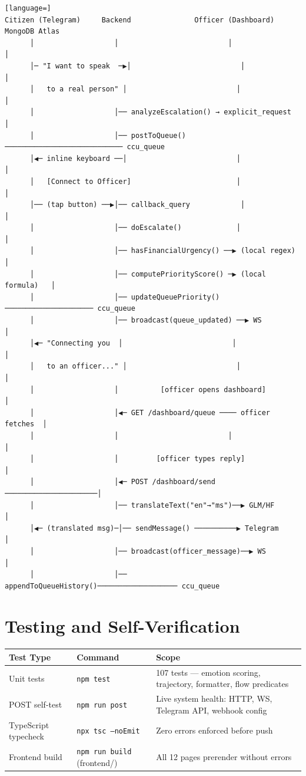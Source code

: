 \documentclass[12pt,a4paper]{article}
\begin{document}
\begin{lstlisting}[language=]
Citizen (Telegram)     Backend               Officer (Dashboard)   MongoDB Atlas
      │                   │                          │                  │
      │─ "I want to speak  ─▶│                          │                  │
      │   to a real person" │                          │                  │
      │                   │── analyzeEscalation() → explicit_request     │
      │                   │── postToQueue() ──────────────────────────── ccu_queue
      │◀─ inline keyboard ──│                          │                  │
      │   [Connect to Officer]                         │                  │
      │── (tap button) ──▶│── callback_query            │                  │
      │                   │── doEscalate()             │                  │
      │                   │── hasFinancialUrgency() ──▶ (local regex)     │
      │                   │── computePriorityScore() ─▶ (local formula)   │
      │                   │── updateQueuePriority() ───────────────────── ccu_queue
      │                   │── broadcast(queue_updated) ──▶ WS           │
      │◀─ "Connecting you  │                          │                  │
      │   to an officer..." │                          │                  │
      │                   │          [officer opens dashboard]            │
      │                   │◀─ GET /dashboard/queue ──── officer fetches  │
      │                   │                          │                  │
      │                   │         [officer types reply]                 │
      │                   │◀─ POST /dashboard/send ──────────────────────│
      │                   │── translateText("en"→"ms")──▶ GLM/HF        │
      │◀─ (translated msg)─│── sendMessage() ──────────▶ Telegram        │
      │                   │── broadcast(officer_message)──▶ WS           │
      │                   │── appendToQueueHistory()─────────────────── ccu_queue
\end{lstlisting}

\section{Testing and Self-Verification}
\label{sec:testing}

\begin{tabular}{@{}lll@{}}
\toprule
\textbf{Test Type} & \textbf{Command} & \textbf{Scope} \\
\midrule
Unit tests           & \texttt{npm test}      & 107 tests — emotion scoring, trajectory, formatter, flow predicates \\
POST self-test       & \texttt{npm run post}  & Live system health: HTTP, WS, Telegram API, webhook config \\
TypeScript typecheck & \texttt{npx tsc --noEmit} & Zero errors enforced before push \\
Frontend build       & \texttt{npm run build} (frontend/) & All 12 pages prerender without errors \\
\bottomrule
\end{tabular}
\end{document}
